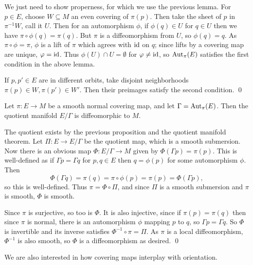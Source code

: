 \bproof

    We just need to show properness, for which we use the previous lemma.
    For $p\in E$, choose $W\subseteq M$ an even covering of $\pi(p)$.
    Then take the sheet of $p$ in $\pi^{-1}W$, call it $U$.
    Then for an automorphism $\phi$, if $\phi(q)\in U$ for $q\in U$ then we have $\pi\circ\phi(q)=\pi(q)$.
    But $\pi$ is a diffeomorphism from $U$, so $\phi(q)=q$.
    As $\pi\circ\phi=\pi$, $\phi$ is a lift of $\pi$ which agrees with ${\rm id}$ on $q$; since lifts by a covering map are unique, $\varphi={\rm id}$.
    Thus $\phi(U)\cap U=\emptyset$ for $\varphi\neq{\rm id}$, so ${\rm Aut}_\pi(E)$ satisfies the first condition in the above lemma.

    If $p,p'\in E$ are in different orbits, take disjoint neighborhoods $\pi(p)\in W,\pi(p')\in W'$.
    Then their preimages satisfy the second condition.
    \qed

\eproof

\bthrm

    Let $\pi\colon E\to M$ be a smooth normal covering map, and let $\Gamma={\rm Aut}_\pi(E)$.
    Then the quotient manifold $E/\Gamma$ is diffeomorphic to $M$.

\ethrm

\bproof

    The quotient exists by the previous proposition and the quotient manifold theorem.
    Let $\Pi\colon E\to E/\Gamma$ be the quotient map, which is a smooth submersion.
    Now there is an obvious map $\Phi\colon E/\Gamma\to M$ given by $\Phi(\Gamma p)=\pi(p)$.
    This is well-defined as if $\Gamma p=\Gamma q$ for $p,q\in E$ then $q=\phi(p)$ for some automorphism $\phi$.
    Then
    $$ \Phi(\Gamma q) = \pi(q) = \pi\circ\phi(p) = \pi(p) = \Phi(\Gamma p) , $$
    so this is well-defined.
    Thus $\pi=\Phi\circ\Pi$, and since $\Pi$ is a smooth submersion and $\pi$ is smooth, $\Phi$ is smooth.

    Since $\pi$ is surjective, so too is $\Phi$.
    It is also injective, since if $\pi(p)=\pi(q)$ then since $\pi$ is normal, there is an automorphism $\phi$ mapping $p$ to $q$,
    so $\Gamma p=\Gamma q$.
    So $\Phi$ is invertible and its inverse satisfies $\Phi^{-1}\circ\pi=\Pi$.
    As $\pi$ is a local diffeomorphism, $\Phi^{-1}$ is also smooth, so $\Phi$ is a diffeomorphism as desired.
    \qed

\eproof

We are also interested in how covering maps interplay with orientation.

\bprop

